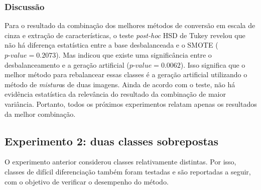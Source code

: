 \subsubsection*{Discussão}


Para o resultado da combinação dos melhores métodos de conversão em escala de cinza e extração de características, o teste \textit{post-hoc} HSD de Tukey revelou que não há diferença estatística entre a base desbalanceada e o SMOTE ($\textit{p-value} = 0.2073$). Mas indicou que existe uma significância entre o desbalanceamento e a geração artificial ($\textit{p-value} = 0.0062$). Isso significa que o melhor método para rebalancear essas classes é a geração artificial utilizando o método de \emph{mistura}s de duas imagens. Ainda de acordo com o teste, não há evidência estatística da relevância do resultado da combinação de maior variância. Portanto, todos os próximos experimentos relatam apenas os resultados da melhor combinação.

\subsection{Experimento 2: duas classes sobrepostas}

O experimento anterior considerou classes relativamente distintas. Por isso, classes de difícil diferenciação também foram testadas e são reportadas a seguir, com o objetivo de verificar o desempenho do método.

